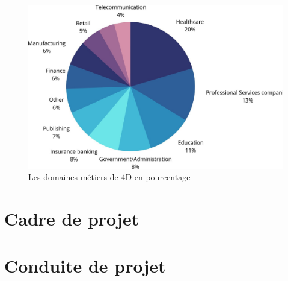 \begin{figure}[h]
    \centering
    \includegraphics[scale=0.3]{Images/domaineMetier.jpg} %
    \caption{Les domaines métiers de 4D en pourcentage}
    \label{fig:domaineMetier}
\end{figure}



\section{Cadre de projet}


\section{Conduite de projet}



